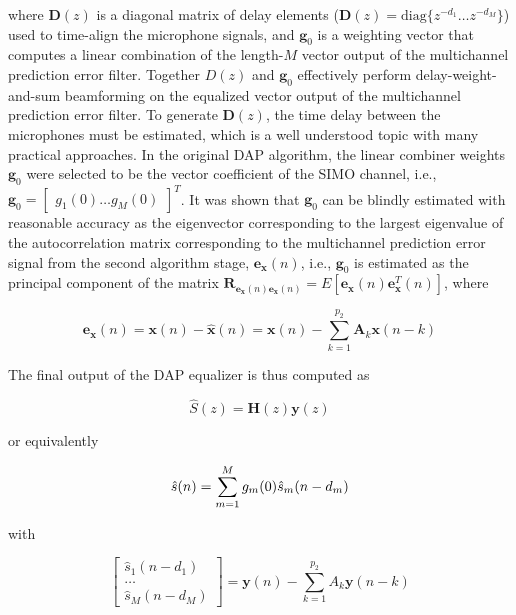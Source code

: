 \noindent
where $\boldsymbol{D}(z)$ is a diagonal matrix of delay elements ($\boldsymbol{D}(z) = \mathrm{diag} \{z^{-d_1} \dots z^{-d_M}\}$) used to time-align the microphone signals, and $\boldsymbol{g}_0$ is a weighting vector that computes a linear combination of the length-$M$ vector output of the multichannel prediction error filter. Together $D(z)$ and $\boldsymbol{g}_0$ effectively perform delay-weight-and-sum beamforming on the equalized vector output of the multichannel prediction error filter. To generate $\boldsymbol{D}(z)$, the time delay between the microphones must be estimated, which is a well understood topic with many practical approaches. In the original DAP algorithm, the linear combiner weights $\boldsymbol{g}_0$ were selected to be the vector coefficient of the SIMO channel, i.e., $\boldsymbol{g}_0 = \begin{bmatrix} g_1(0) \dots g_M(0) \end{bmatrix} ^T$. It was shown that $\boldsymbol{g}_0$ can be blindly estimated with reasonable accuracy as the eigenvector corresponding to the largest eigenvalue of the autocorrelation matrix corresponding to the multichannel prediction error signal from the second algorithm stage, $\boldsymbol{e}_{\boldsymbol{x}}(n)$, i.e., $\boldsymbol{g}_0$ is estimated as the principal component of the matrix $\boldsymbol{R}_{\boldsymbol{e}_{\boldsymbol{x}}(n) \boldsymbol{e}_{\boldsymbol{x}}(n)} = E[\boldsymbol{e}_{\boldsymbol{x}}(n) \boldsymbol{e}^T_{\boldsymbol{x}}(n) ]$, where

\begin{equation}
	\boldsymbol{e}_{\boldsymbol{x}}(n) = \boldsymbol{x}(n) - \hat{\boldsymbol{x}}(n) = \boldsymbol{x}(n) - \sum_{k=1}^{p_2} \boldsymbol{A}_k \boldsymbol{x}(n-k)
\end{equation}

The final output of the DAP equalizer is thus computed as 

\begin{equation}
	\hat{S}(z) = \boldsymbol{H}(z) \boldsymbol{y}(z)  \label{eq:dap_eq_output}
\end{equation}

\noindent
or equivalently

\begin{equation}
	\hat{s}(n) = \sum_{m=1}^{M} g_m(0) \hat{s}_m(n-d_m) \\
\end{equation}

\noindent 
with

\begin{equation}
	\begin{bmatrix} \hat{s}_1(n-d_1) \\ \dots \\ \hat{s}_M(n-d_M) \end{bmatrix} =
	\boldsymbol{y}(n) - \sum_{k=1}^{p_2} A_k \boldsymbol{y}(n-k)
\end{equation}

